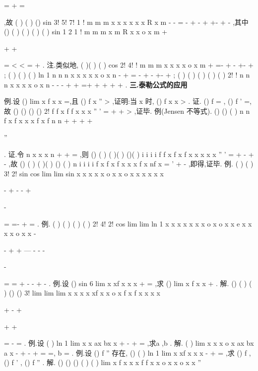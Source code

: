 =
+
=




,故 
(
)
(
)
()
sin
3!
5!
7!
1 !
m
m
m
x
x
x
x
x
x
R
x
m
-
-
=
-
+
-
+
+-
+
-
\Lambda 
,其中 
()
(
)
(
)
(
)
(
)
sin
1 2
1 !
m
m
m
x
m
R
x
x
o x
m
\pi 
\theta 
\theta 
+


+
+




=
<
<
=
+
. 
\textcolor{lyred}{注}.类似地,
(
)(
)
(
)
cos
2!
4!
!
m
m
m
x
x
x
x
o x
m
+
=-
+
-
+-
+
\Lambda 
; 
(
)
(
)
(
)
ln 1
n
n
n
x
x
x
x
x
o x
n
-
+
=
-
+
-
+-
+
\Lambda 
; 
(
)
(
)
(
)
(
)
(
)
2!
!
n
n
n
x
x
x
x
o x
n
\alpha 
\alpha \alpha 
\alpha \alpha 
\alpha 
\alpha 
-
-
-
+
+
=+
+
+
+
+
\Lambda 
\Lambda 
. 
\vspace{4pt}
{\bfseries \textcolor{lyred}{三.泰勒公式的应用}}

\textcolor{lyred}{例}.设
()
lim
x
f x
x
\to 
=,且
()
f
x
''
>
,证明:当
x \neq 
时,
()
f x
x
>
. 
证.
()
f
=
,
()
f '
=,故
()
()
()
()
2!
f
f x
f
f
x
x
x
\psi 
''
'
=
+
+
>
,证毕. 
\textcolor{lyred}{例(Jensen 不等式)}.
()
()
(
)
n
n
f x
f x
x
x
f
x
f
n
n
+
+
+
+


''
\ge 
\Rightarrow 
\ge 




\Lambda 
\Lambda 
. 
证.令
n
x
x
x
n
+
+
=
\Lambda 
,则
()
(
)
(
)(
)
()(
)
i
i
i
i
f
f x
f x
f
x
x
x
x
x
\psi 
''
'
=
+
-
+
-
,故 
()
(
)
(
)(
)
()
(
)
n
i
i
i
i
f x
f x
f
x
x
x
f x
nf x
=
'
\ge 
+
-
\Rightarrow 
\ge 
\sum 
,即得,证毕. 
\textcolor{lyred}{例}.
(
)
(
)
3!
2!
sin
cos
lim
lim
sin
x
x
x
x
x
o x
x
o x
x
x
x
x
x
\to 
\to 


-
+
-
-
+


-


=
=-
+
=
. 
\textcolor{lyred}{例}.
(
)
(
)
(
)
(
)
2!
4!
2!
cos
lim
lim
ln 1
x
x
x
x
x
x
x
o x
o x
x
e
x
x
x
x
o x
x
-
\to 
\to 




-
+
+
---
-
-
-




-




=
=
+
-
-
+
-
. 
\textcolor{lyred}{例}.设
()
sin 6
lim
x
xf x
x
x
\to 
+
=
,求
()
lim
x
f
x
x
\to 
+
. 
解.
()
(
)
(
)
()
()
3!
lim
lim
lim
x
x
x
x
xf x
x
o x
f x
f x
x
x
x
\to 
\to 
\to 


+
-
+


+
+



=
-
\Rightarrow 
=
. 
\textcolor{lyred}{例}.设
(
)
ln 1
lim
x
x
ax
bx
x
\to 
+
-
+
=
,求a ,b . 
解.
(
)
lim
x
x
x
o x
ax
bx
a
x
\to 
-
+
-
+
=
\Rightarrow 
=,
b =
. 
\textcolor{lyred}{例}.设
()
f ''
存在,
()
(
)
ln 1
lim
x
xf x
x
x
\to 
-
+
=
,求
()
f
,
()
f '
,
()
f ''
. 
解.
()
()
()
(
)
(
)
lim
x
f
x
x
x f
f
x
x
o x
x
o x
x
\to 
''




